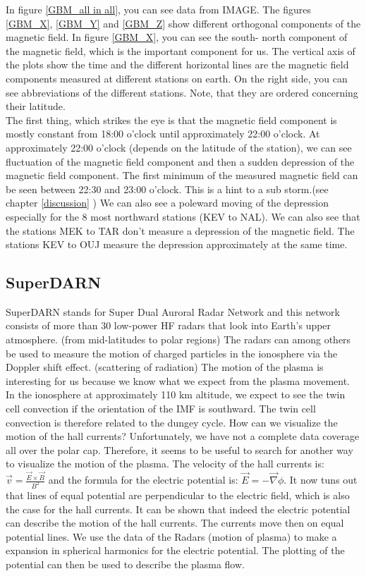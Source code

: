 \documentclass[10pt,a4paper]{article}
\begin{document}
In figure \ref{GBM_all in all}, you can see data from IMAGE. The figures \ref{GBM_X}, \ref{GBM_Y} and \ref{GBM_Z} show different orthogonal components of the magnetic field. In figure \ref{GBM_X}, you can see the south- north component of the magnetic field, which is the important component for us. The vertical axis of the plots show the time and the different horizontal lines are the magnetic field components measured at different stations on earth. On the right side, you can see abbreviations of the different stations. Note, that they are ordered concerning their latitude. \\
The first thing, which strikes the eye is that the magnetic field component is mostly constant from 18:00 o'clock until approximately 22:00 o'clock. At approximately 22:00 o'clock (depends on the latitude of the station), we can see fluctuation of the magnetic field component and then a sudden depression of the magnetic field component. The first minimum of the measured magnetic field can be seen between 22:30 and 23:00 o'clock.
This is a hint to a sub storm.(see chapter \ref{discussion} ) We can also see a poleward moving of the depression especially for the 8 most northward stations (KEV to NAL). We can also see that the stations MEK to TAR don't measure a depression of the magnetic field. The stations KEV to OUJ measure the depression approximately at the same time. 

\clearpage

\subsection{SuperDARN \label{0_CHAPTER_SUPERDARN}}

SuperDARN stands for  Super Dual Auroral Radar Network and this network consists of more than 30 low-power HF radars that look into Earth's upper atmosphere. (from mid-latitudes to polar regions) The radars can among others be used to measure the motion of charged particles in the ionosphere via the Doppler shift effect. (scattering of radiation)
The motion of the plasma is interesting for us because we know what we expect from the plasma movement. In the ionosphere at approximately 110 km altitude, we expect to see the twin cell convection if the orientation of the IMF is southward. The twin cell convection is therefore related to the dungey cycle. 
How can we visualize the motion of the hall currents? Unfortunately, we have not a complete data coverage all over the polar cap. Therefore, it seems to be useful to search for another way to visualize the motion of the plasma. 
The velocity of the hall currents is: $\vec{v}=\frac{\vec{E}\times \vec{B}}{B^2}$ and the formula for the electric potential is: $\vec{E}=-\vec{\nabla} \phi$. It now tuns out that lines of equal potential are perpendicular to the electric field, which is also the case for the hall currents. It can be shown that indeed the electric potential can describe the motion of the hall currents. The currents move then on equal potential lines. 
We use the data of the Radars (motion of plasma) to make a expansion in spherical harmonics for the electric potential. The plotting of the potential can then be used to describe the plasma flow. 
\end{document}

